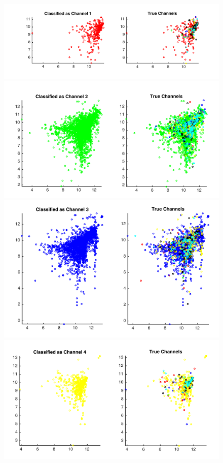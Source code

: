 \documentclass{article} %
\begin{document}
\begin{figure}[h!]
\centering
 \includegraphics[scale = 0.4]{precisionFig1.pdf}\hspace{0.5cm}
 \includegraphics[scale = 0.4]{precisionFig2.pdf}
 \includegraphics[scale = 0.38]{precisionFig3.pdf}\hspace{0.5cm}
 \includegraphics[scale = 0.4]{precisionFig4.pdf}

\end{figure}
\end{document}
